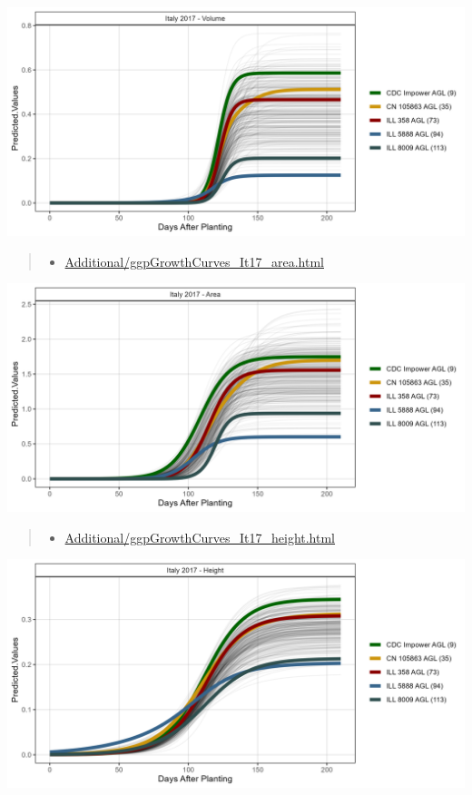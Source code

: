 \documentclass[
]{article}
\providecommand{\tightlist}{%
  \setlength{\itemsep}{0pt}\setlength{\parskip}{0pt}}
\begin{document}
\includegraphics{Additional/ggGrowthCurves_It17_volume.png}

\begin{quote}
\begin{itemize}
\tightlist
\item
  \href{https://derekmichaelwright.github.io/AGILE_LDP_UAV/Additional/ggpGrowthCurves_It17_area.html}{Additional/ggpGrowthCurves\_It17\_area.html}
\end{itemize}
\end{quote}

\includegraphics{Additional/ggGrowthCurves_It17_area.png}

\begin{quote}
\begin{itemize}
\tightlist
\item
  \href{https://derekmichaelwright.github.io/AGILE_LDP_UAV/Additional/ggpGrowthCurves_It17_height.html}{Additional/ggpGrowthCurves\_It17\_height.html}
\end{itemize}
\end{quote}

\includegraphics{Additional/ggGrowthCurves_It17_height.png}
\end{document}
